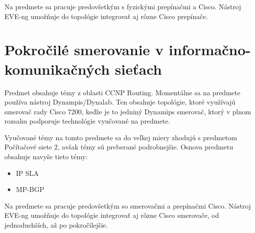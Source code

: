 Na predmete sa pracuje predovšetkým s fyzickými prepínačmi a Cisco. Nástroj EVE-ng umožňuje do topológie integrovať aj rôzne Cisco prepínače.





\section{Pokročilé smerovanie v informačno-komunikačných sieťach}

Predmet obsahuje témy z oblasti CCNP Routing. Momentálne sa na predmete používa nástroj Dynampis/Dynalab. Ten obsahuje topológie, ktoré využívajú smerovač rady Cisco 7200, keďže je to jedniný Dynamips smerovač, ktorý v plnom rozsahu podporuje technológie vyučované na predmete.

Vyučované témy na tomto predmete sa do veľkej miery zhodujú s predmetom Počítačové siete 2, avšak témy sú preberané podrobnejšie. Osnova predmetu obsahuje navyše tieto témy:

\begin{itemize}[noitemsep]
    \item IP SLA
    \item MP-BGP
\end{itemize}

Na predmete sa pracuje predovšetkým so smerovačmi a prepínačmi Cisco. Nástroj EVE-ng umožňuje do topológie integrovať aj rôzne Cisco smerovače, od jednoduchších, až po pokročilejšie.